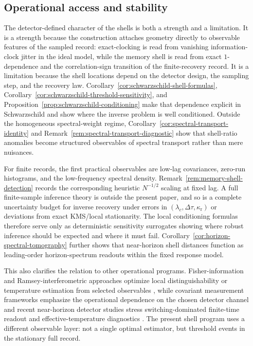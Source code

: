 \subsection{Operational access and stability}

The detector-defined character of the shells is both a strength and a limitation. It is a strength because the construction attaches geometry directly to observable features of the sampled record: exact-clocking is read from vanishing information-clock jitter in the ideal model, while the memory shell is read from exact $1$-dependence and the correlation-sign transition of the finite-recovery record. It is a limitation because the shell locations depend on the detector design, the sampling step, and the recovery law. Corollary~\ref{cor:schwarzschild-shell-formulas}, Corollary~\ref{cor:schwarzschild-threshold-sensitivity}, and Proposition~\ref{prop:schwarzschild-conditioning} make that dependence explicit in Schwarzschild and show where the inverse problem is well conditioned. Outside the homogeneous spectral-weight regime, Corollary~\ref{cor:spectral-transport-identity} and Remark~\ref{rem:spectral-transport-diagnostic} show that shell-ratio anomalies become structured observables of spectral transport rather than mere nuisances.

For finite records, the first practical observables are low-lag covariances, zero-run histograms, and the low-frequency spectral density. Remark~\ref{rem:memory-shell-detection} records the corresponding heuristic $N^{-1/2}$ scaling at fixed lag. A full finite-sample inference theory is outside the present paper, and so is a complete uncertainty budget for inverse recovery under errors in $(\lambda_c,\Delta\tau,\kappa_{\mathrm r})$ or deviations from exact KMS/local stationarity. The local conditioning formulas therefore serve only as deterministic sensitivity surrogates showing where robust inference should be expected and where it must fail. Corollary~\ref{cor:horizon-spectral-tomography} further shows that near-horizon shell distances function as leading-order horizon-spectrum readouts within the fixed response model.

This also clarifies the relation to other operational programs. Fisher-information and Ramsey-interferometric approaches optimize local distinguishability or temperature estimation from selected observables \cite{WangEtAl2014Metrology,HaoWu2016Unruh,FengZhang2022QFI,DuMann2021AdS,CostaEtAl2020Ramsey}, while covariant measurement frameworks emphasize the operational dependence on the chosen detector channel \cite{Fewster2020} and recent near-horizon detector studies stress switching-dominated finite-time readout and effective-temperature diagnostics \cite{ShallueCarroll2025}. The present shell program uses a different observable layer: not a single optimal estimator, but threshold events in the stationary full record.

